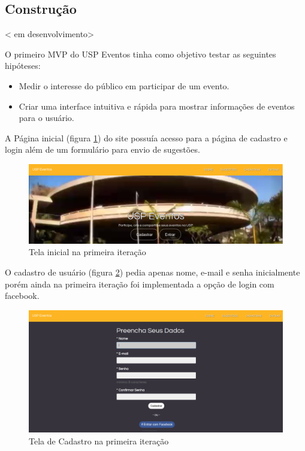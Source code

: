 \subsection{Construção}
< em desenvolvimento>
         \par O primeiro MVP do USP Eventos tinha como objetivo testar as seguintes hipóteses:
         \begin{itemize}
         \item Medir o interesse do público em participar de um evento.
         \item Criar uma interface intuitiva e rápida para mostrar informações de eventos para o usuário.
         \end{itemize}
        \par A Página inicial (figura \ref{fig:landing_pagev1}) do site possuía acesso para a página de cadastro e login além de um formulário para envio de sugestões.
        \begin{figure}[htb]
		\includegraphics[width=15cm]{figuras/landing_pagev1}
		\caption{\label{fig:landing_pagev1} Tela inicial na primeira iteração }
		\end{figure}
        \par O cadastro de usuário (figura \ref{fig:sign_upv1}) pedia apenas nome, e-mail e senha inicialmente porém ainda na primeira iteração foi implementada a opção de login com facebook.
        \begin{figure}[htb]
		\includegraphics[width=15cm]{figuras/sign_upv1}
		\caption{\label{fig:sign_upv1} Tela de Cadastro na primeira iteração}
		\end{figure}
